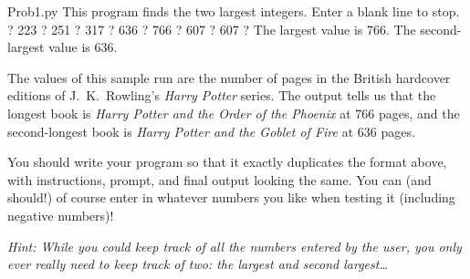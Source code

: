 \documentclass[letterpaper,12pt]{exam}
\begin{document}
\begin{questions}
\begin{question}
		\begin{termout}{Prob1.py}
This program finds the two largest integers.
Enter a blank line to stop.
  ? 223
  ? 251
  ? 317
  ? 636
  ? 766
  ? 607
  ? 607
  ? 
The largest value is 766.
The second-largest value is 636.
		\end{termout}

		The values of this sample run are the number of pages in the British hardcover editions of J.~K.~Rowling's \emph{Harry Potter} series. The output tells us that the longest book is \emph{Harry Potter and the Order of the Phoenix} at 766 pages, and the second-longest book is \emph{Harry Potter and the Goblet of Fire} at 636 pages.

		You should write your program so that it exactly duplicates the format above, with instructions, prompt, and final output looking the same. You can (and should!) of course enter in whatever numbers you like when testing it (including negative numbers)!

		\emph{Hint: While you could keep track of all the numbers entered by the user, you only ever really need to keep track of two: the largest and second largest\ldots}

	\end{question}

	\newpage

	\begin{question}
\end{question}
\end{questions}
\end{document}
